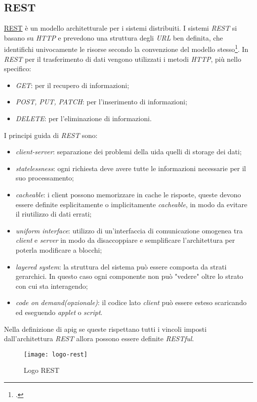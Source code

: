 \subsection{REST}
\href{https://restfulapi.net/}{REST} è un modello architetturale per i sistemi distribuiti. I sistemi \textit{REST} si basano su \textit{HTTP} e prevedono una struttura degli \textit{URL} ben definita, che identifichi univocamente le risorse secondo la convenzione del modello stesso\footcite{Resource Naming: https://restfulapi.net/resource-naming/}. 
In \textit{REST} per il trasferimento di dati vengono utilizzati i metodi \textit{HTTP}, più nello specifico:
\begin{itemize}
    \item \textit{GET}: per il recupero di informazioni;
    \item \textit{POST, PUT, PATCH}: per l'inserimento di informazioni;
    \item \textit{DELETE}: per l'eliminazione di informazioni.
\end{itemize}
I principi guida di \textit{REST} sono:
\begin{itemize}
    \item \textit{client-server}: separazione dei problemi della \gls{ui}\glsfirstoccur da quelli di storage dei dati;
    \item \textit{statelessness}: ogni richiesta deve avere tutte le informazioni necessarie per il suo processamento;
    \item \textit{cacheable}: i client possono memorizzare in cache le risposte, queste devono essere definite esplicitamente o implicitamente \textit{cacheable}, in modo da evitare il riutilizzo di dati errati;
    \item \textit{uniform interface}: utilizzo di un'interfaccia di comunicazione omogenea tra \textit{client} e \textit{server} in modo da disaccoppiare e semplificare l'architettura per poterla modificare a blocchi;
    \item \textit{layered system}: la struttura del sistema può essere composta da strati gerarchici. In questo caso ogni componente non può "vedere" oltre lo strato con cui sta interagendo;
    \item \textit{code on demand(opzionale)}: il codice lato \textit{client} può essere esteso scaricando ed eseguendo \textit{applet} o \textit{script}.
\end{itemize}
Nella definizione di \gls{apig} se queste rispettano tutti i vincoli imposti dall'architettura \textit{REST} allora possono essere definite \textit{RESTful}.
\begin{figure}[h]
    \begin{center}
    \texttt{[image: logo-rest]}
    \caption{Logo REST}
    \label{fig:figure6}
    \end{center}
\end{figure}

